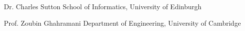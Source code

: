 

\begin{cvskills}

  \cvskill
    {Dr. Charles Sutton} %
    {School of Informatics, University of Edinburgh \href{mailto:csutton@inf.ed.ac.uk}{\faEnvelope\acvHeaderIconSep\@email}} %

  \cvskill
    {Prof. Zoubin Ghahramani} %
    {Department of Engineering, University of Cambridge \href{mailto:zoubin@eng.cam.ac.uk}{\faEnvelope\acvHeaderIconSep\@email}} %

\end{cvskills}
